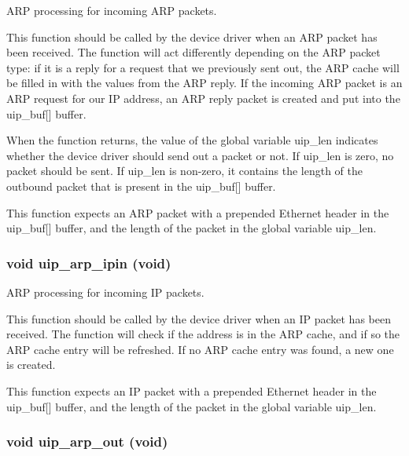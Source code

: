 ARP processing for incoming ARP packets. 

This function should be called by the device driver when an ARP packet has been received. The function will act differently depending on the ARP packet type: if it is a reply for a request that we previously sent out, the ARP cache will be filled in with the values from the ARP reply. If the incoming ARP packet is an ARP request for our IP address, an ARP reply packet is created and put into the uip\_\-buf\mbox{[}\mbox{]} buffer.

When the function returns, the value of the global variable uip\_\-len indicates whether the device driver should send out a packet or not. If uip\_\-len is zero, no packet should be sent. If uip\_\-len is non-zero, it contains the length of the outbound packet that is present in the uip\_\-buf\mbox{[}\mbox{]} buffer.

This function expects an ARP packet with a prepended Ethernet header in the uip\_\-buf\mbox{[}\mbox{]} buffer, and the length of the packet in the global variable uip\_\-len. \hypertarget{a00067_g5cf8d6974a89ad67c5faf9b19261cb7c}{
\subsubsection[uip\_\-arp\_\-ipin]{\setlength{\rightskip}{0pt plus 5cm}void uip\_\-arp\_\-ipin (void)}}
\label{a00067_g5cf8d6974a89ad67c5faf9b19261cb7c}


ARP processing for incoming IP packets. 

This function should be called by the device driver when an IP packet has been received. The function will check if the address is in the ARP cache, and if so the ARP cache entry will be refreshed. If no ARP cache entry was found, a new one is created.

This function expects an IP packet with a prepended Ethernet header in the uip\_\-buf\mbox{[}\mbox{]} buffer, and the length of the packet in the global variable uip\_\-len. \hypertarget{a00067_g54b27e45df15e10a0eb1a3e3a91417d2}{
\subsubsection[uip\_\-arp\_\-out]{\setlength{\rightskip}{0pt plus 5cm}void uip\_\-arp\_\-out (void)}}
\label{a00067_g54b27e45df15e10a0eb1a3e3a91417d2}


